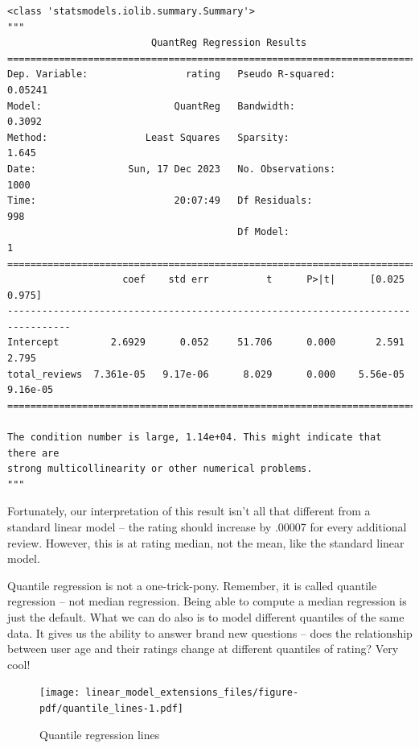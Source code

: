 \documentclass[
  letterpaper,
]{krantz}
\begin{document}
\begin{verbatim}
<class 'statsmodels.iolib.summary.Summary'>
"""
                         QuantReg Regression Results                          
==============================================================================
Dep. Variable:                 rating   Pseudo R-squared:              0.05241
Model:                       QuantReg   Bandwidth:                      0.3092
Method:                 Least Squares   Sparsity:                        1.645
Date:                Sun, 17 Dec 2023   No. Observations:                 1000
Time:                        20:07:49   Df Residuals:                      998
                                        Df Model:                            1
=================================================================================
                    coef    std err          t      P>|t|      [0.025      0.975]
---------------------------------------------------------------------------------
Intercept         2.6929      0.052     51.706      0.000       2.591       2.795
total_reviews  7.361e-05   9.17e-06      8.029      0.000    5.56e-05    9.16e-05
=================================================================================

The condition number is large, 1.14e+04. This might indicate that there are
strong multicollinearity or other numerical problems.
"""
\end{verbatim}

Fortunately, our interpretation of this result isn't all that different
from a standard linear model -- the rating should increase by .00007 for
every additional review. However, this is at rating median, not the
mean, like the standard linear model.

Quantile regression is not a one-trick-pony. Remember, it is called
quantile regression -- not median regression. Being able to compute a
median regression is just the default. What we can do also is to model
different quantiles of the same data. It gives us the ability to answer
brand new questions -- does the relationship between user age and their
ratings change at different quantiles of rating? Very cool!

\begin{figure}

{\centering \texttt{[image: linear\_model\_extensions\_files/figure-pdf/quantile\_lines-1.pdf]}

}

\caption{Quantile regression lines}

\end{figure}
\end{document}
